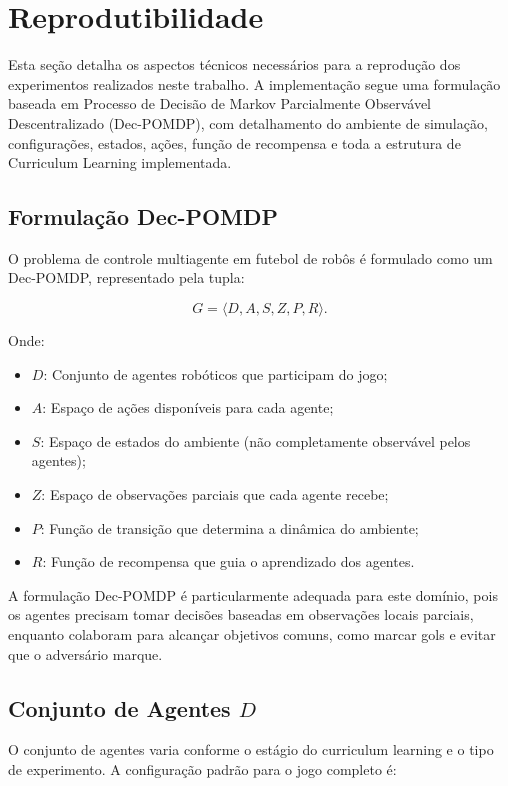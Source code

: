\section{Reprodutibilidade}

Esta seção detalha os aspectos técnicos necessários para a reprodução dos experimentos realizados neste trabalho. A implementação segue uma formulação baseada em Processo de Decisão de Markov Parcialmente Observável Descentralizado (Dec-POMDP), com detalhamento do ambiente de simulação, configurações, estados, ações, função de recompensa e toda a estrutura de Curriculum Learning implementada.

\subsection{Formulação Dec-POMDP}

O problema de controle multiagente em futebol de robôs é formulado como um Dec-POMDP, representado pela tupla:

$$G = \langle D, A, S, Z, P, R \rangle.$$

Onde:
\begin{itemize}
    \item $D$: Conjunto de agentes robóticos que participam do jogo;
    \item $A$: Espaço de ações disponíveis para cada agente;
    \item $S$: Espaço de estados do ambiente (não completamente observável pelos agentes);
    \item $Z$: Espaço de observações parciais que cada agente recebe;
    \item $P$: Função de transição que determina a dinâmica do ambiente;
    \item $R$: Função de recompensa que guia o aprendizado dos agentes.
\end{itemize}

A formulação Dec-POMDP é particularmente adequada para este domínio, pois os agentes precisam tomar decisões baseadas em observações locais parciais, enquanto colaboram para alcançar objetivos comuns, como marcar gols e evitar que o adversário marque.

\subsection{Conjunto de Agentes $D$}

O conjunto de agentes varia conforme o estágio do curriculum learning e o tipo de experimento. A configuração padrão para o jogo completo é:


